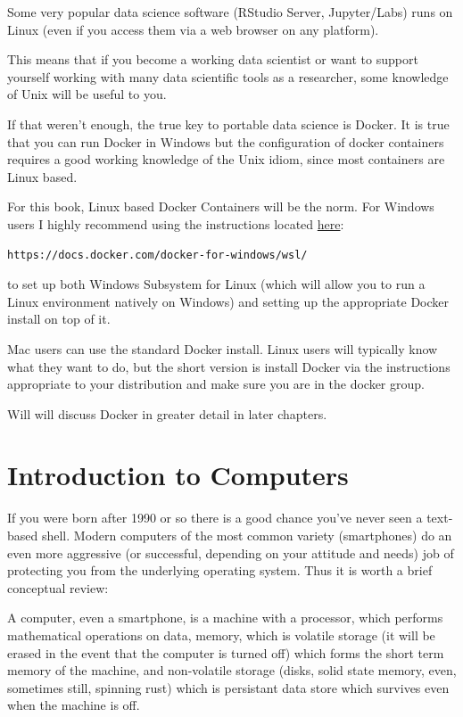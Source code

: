 \documentclass[11pt]{article}
\begin{document}
Some very popular data science software (RStudio Server, Jupyter/Labs)
runs on Linux (even if you access them via a web browser on any
platform).

This means that if you become a working data scientist or want to
support yourself working with many data scientific tools as a
researcher, some knowledge of Unix will be useful to you.

If that weren't enough, the true key to portable data science is
Docker. It is true that you can run Docker in Windows but the
configuration of docker containers requires a good working knowledge
of the Unix idiom, since most containers are Linux based.

For this book, Linux based Docker Containers will be the norm. For
Windows users I highly recommend using the instructions located \href{https://docs.docker.com/docker-for-windows/wsl/}{here}:

\begin{verbatim}
https://docs.docker.com/docker-for-windows/wsl/
\end{verbatim}

to set up both Windows Subsystem for Linux (which will allow you to
run a Linux environment natively on Windows) and setting up the
appropriate Docker install on top of it. 

Mac users can use the standard Docker install. Linux users will
typically know what they want to do, but the short version is install
Docker via the instructions appropriate to your distribution and make
sure you are in the docker group. 

Will will discuss Docker in greater detail in later chapters.

\section{Introduction to Computers}
\label{sec:orgc650e00}

If you were born after 1990 or so there is a good chance you've never
seen a text-based shell. Modern computers of the most common variety
(smartphones) do an even more aggressive (or successful, depending on
your attitude and needs) job of protecting you from the underlying
operating system. Thus it is worth a brief conceptual review:

A computer, even a smartphone, is a machine with a processor, which
performs mathematical operations on data, memory, which is volatile
storage (it will be erased in the event that the computer is turned
off) which forms the short term memory of the machine, and
non-volatile storage (disks, solid state memory, even, sometimes
still, spinning rust) which is persistant data store which survives
even when the machine is off.
\end{document}
